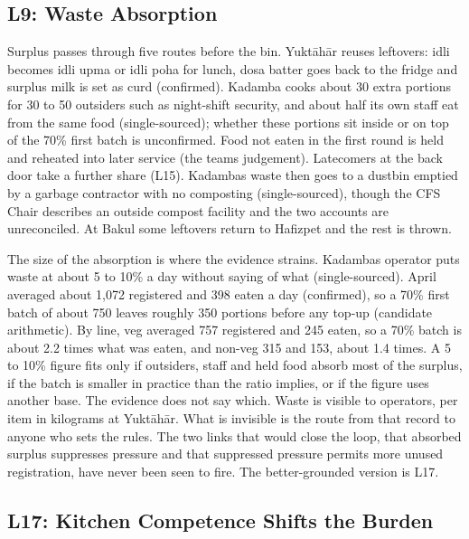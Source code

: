 \documentclass[
  10pt,
  table]{article}
\begin{document}
\subsection{L9: Waste Absorption}\label{l9-waste-absorption}

Surplus passes through five routes before the bin. Yuktāhār reuses leftovers: idli becomes idli upma or idli poha for lunch, dosa batter goes back to the fridge and surplus milk is set as curd (confirmed). Kadamba cooks about 30 extra portions for 30 to 50 outsiders such as night-shift security, and about half its own staff eat from the same food (single-sourced); whether these portions sit inside or on top of the 70\% first batch is unconfirmed. Food not eaten in the first round is held and reheated into later service (the team\textquotesingle s judgement). Latecomers at the back door take a further share (L15). Kadamba\textquotesingle s waste then goes to a dustbin emptied by a garbage contractor with no composting (single-sourced), though the CFS Chair describes an outside compost facility and the two accounts are unreconciled. At Bakul some leftovers return to Hafizpet and the rest is thrown.

The size of the absorption is where the evidence strains. Kadamba\textquotesingle s operator puts waste at about 5 to 10\% a day without saying of what (single-sourced). April averaged about 1,072 registered and 398 eaten a day (confirmed), so a 70\% first batch of about 750 leaves roughly 350 portions before any top-up (candidate arithmetic). By line, veg averaged 757 registered and 245 eaten, so a 70\% batch is about 2.2 times what was eaten, and non-veg 315 and 153, about 1.4 times. A 5 to 10\% figure fits only if outsiders, staff and held food absorb most of the surplus, if the batch is smaller in practice than the ratio implies, or if the figure uses another base. The evidence does not say which. Waste is visible to operators, per item in kilograms at Yuktāhār. What is invisible is the route from that record to anyone who sets the rules. The two links that would close the loop, that absorbed surplus suppresses pressure and that suppressed pressure permits more unused registration, have never been seen to fire. The better-grounded version is L17.

\subsection{L17: Kitchen Competence Shifts the Burden}\label{l17-kitchen-competence-shifts-the-burden}
\end{document}
